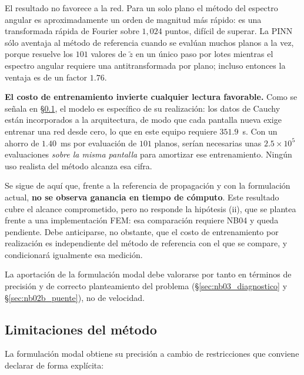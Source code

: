 El resultado no favorece a la red. Para un solo plano el método del espectro
angular es aproximadamente un orden de magnitud más rápido: es una transformada
rápida de Fourier sobre $1{,}024$ puntos, difícil de superar. La PINN sólo
aventaja al método de referencia cuando se evalúan muchos planos a la vez,
porque resuelve los $101$ valores de $\tilde z$ en un único paso por lotes
mientras el espectro angular requiere una antitransformada por plano; incluso
entonces la ventaja es de un factor $1.76$.

\textbf{El costo de entrenamiento invierte cualquier lectura favorable.} Como se
señala en §\ref{sec:nb03_limitaciones}, el modelo es específico de su
realización: los datos de Cauchy están incorporados a la arquitectura, de modo
que cada pantalla nueva exige entrenar una red desde cero, lo que en este equipo
requiere $351.9$~s. Con un ahorro de
$1.40$~ms por evaluación de $101$ planos, serían necesarias unas
$2.5\times10^{5}$ evaluaciones \emph{sobre la misma pantalla} para amortizar
ese entrenamiento. Ningún uso realista del método
alcanza esa cifra.

Se sigue de aquí que, frente a la referencia de propagación y con la
formulación actual, \textbf{no se observa ganancia en tiempo de cómputo}. Este
resultado cubre el alcance comprometido, pero no responde la hipótesis (ii),
que se plantea frente a una implementación FEM: esa comparación requiere NB04 y
queda pendiente. Debe anticiparse, no obstante, que el costo de entrenamiento
por realización es independiente del método de referencia con el que se
compare, y condicionará igualmente esa medición.

La aportación de la formulación modal debe valorarse por tanto en términos de
precisión y de correcto planteamiento del problema
(§\ref{sec:nb03_diagnostico} y §\ref{sec:nb02b_puente}), no de velocidad.

\subsection{Limitaciones del método}
\label{sec:nb03_limitaciones}

La formulación modal obtiene su precisión a cambio de restricciones que
conviene declarar de forma explícita:

